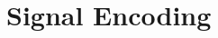 \section{Signal Encoding}
\label{sec: Signal Encoding}

                        
                        


